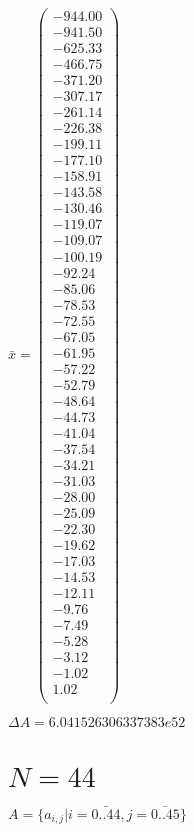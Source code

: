 \documentclass[a4paper,12pt]{article}
\begin{document}
$\bar { x } = \begin{pmatrix}
-944.00 \\
-941.50 \\
-625.33 \\
-466.75 \\
-371.20 \\
-307.17 \\
-261.14 \\
-226.38 \\
-199.11 \\
-177.10 \\
-158.91 \\
-143.58 \\
-130.46 \\
-119.07 \\
-109.07 \\
-100.19 \\
-92.24 \\
-85.06 \\
-78.53 \\
-72.55 \\
-67.05 \\
-61.95 \\
-57.22 \\
-52.79 \\
-48.64 \\
-44.73 \\
-41.04 \\
-37.54 \\
-34.21 \\
-31.03 \\
-28.00 \\
-25.09 \\
-22.30 \\
-19.62 \\
-17.03 \\
-14.53 \\
-12.11 \\
-9.76 \\
-7.49 \\
-5.28 \\
-3.12 \\
-1.02 \\
1.02 \\
\end{pmatrix}
$

$\Delta A = 6.041526306337383e52$



\section{ $N = 44$ }
$A = \{ a _{ i, j } | i = \bar { 0..44 }, j = \bar { 0..45 } \}$
\end{document}
